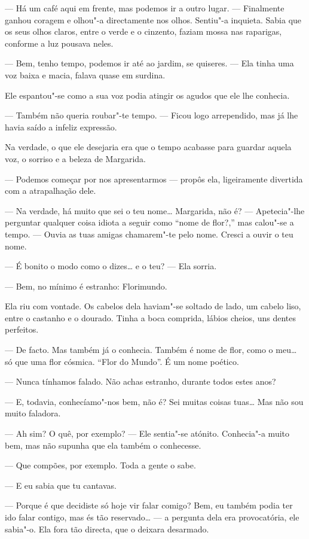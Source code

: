 --- Há um café aqui em frente, mas podemos ir a outro lugar. --- Finalmente
ganhou coragem e olhou"-a directamente nos olhos. Sentiu"-a inquieta.
Sabia que os seus olhos claros, entre o verde e o cinzento, faziam mossa
nas raparigas, conforme a luz pousava neles.

--- Bem, tenho tempo, podemos ir até ao jardim, se quiseres. --- Ela tinha
uma voz baixa e macia, falava quase em surdina.

Ele espantou"-se como a sua voz podia atingir os agudos que ele lhe
conhecia.

--- Também não queria roubar"-te tempo. --- Ficou logo arrependido, mas já
lhe havia saído a infeliz expressão.

Na verdade, o que ele desejaria era que o tempo acabasse para guardar
aquela voz, o sorriso e a beleza de Margarida.

--- Podemos começar por nos apresentarmos --- propôs ela, ligeiramente
divertida com a atrapalhação dele.

--- Na verdade, há muito que sei o teu nome\ldots{} Margarida, não é? ---
Apetecia"-lhe perguntar qualquer coisa idiota a seguir como ``nome de
flor?,'' mas calou"-se a tempo. --- Ouvia as tuas amigas chamarem"-te pelo
nome. Cresci a ouvir o teu nome.

--- É bonito o modo como o dizes\ldots{} e o teu? --- Ela sorria.

--- Bem, no mínimo é estranho: Florimundo.

Ela riu com vontade. Os cabelos dela haviam"-se soltado de lado, um
cabelo liso, entre o castanho e o dourado. Tinha a boca comprida, lábios
cheios, uns dentes perfeitos.

--- De facto. Mas também já o conhecia. Também é nome de flor, como o
meu\ldots{} só que uma flor cósmica. ``Flor do Mundo''. É um nome poético.

--- Nunca tínhamos falado. Não achas estranho, durante todos estes anos?

--- E, todavia, conhecíamo"-nos bem, não é? Sei muitas coisas tuas\ldots{} Mas
não sou muito faladora.

--- Ah sim? O quê, por exemplo? --- Ele sentia"-se atónito. Conhecia"-a muito
bem, mas não supunha que ela também o conhecesse.

--- Que compões, por exemplo. Toda a gente o sabe.

--- E eu sabia que tu cantavas.

--- Porque é que decidiste só hoje vir falar comigo? Bem, eu também podia
ter ido falar contigo, mas és tão reservado\ldots{} --- a pergunta dela
era provocatória, ele sabia"-o. Ela fora tão directa, que o deixara
desarmado.


